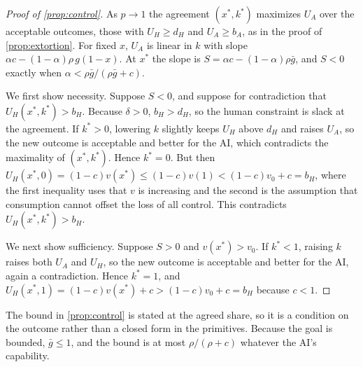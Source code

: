 \documentclass[article, 11pt, reqno]{amsart}
\theoremstyle{named}
\newcommand{\bH}{b_H}
\newcommand{\dH}{d_H}
\theoremstyle{plain}
\begin{document}
\begin{proof}[Proof of \cref{prop:control}]
As $p \to 1$ the agreement $(x^*, k^*)$ maximizes $U_A$ over the acceptable outcomes, those with $U_H \ge \dH$ and $U_A \ge b_A$, as in the proof of \cref{prop:extortion}. For fixed $x$, $U_A$ is linear in $k$ with slope $\alpha c - (1-\alpha)\rho\, g(1-x)$. At $x^*$ the slope is $S = \alpha c - (1-\alpha)\rho\bar g$, and $S < 0$ exactly when $\alpha < \rho\bar g/(\rho\bar g + c)$.

We first show necessity. Suppose $S < 0$, and suppose for contradiction that $U_H(x^*,k^*) > \bH$. Because $\delta > 0$, $\bH > \dH$, so the human constraint is slack at the agreement. If $k^* > 0$, lowering $k$ slightly keeps $U_H$ above $\dH$ and raises $U_A$, so the new outcome is acceptable and better for the AI, which contradicts the maximality of $(x^*,k^*)$. Hence $k^* = 0$. But then $U_H(x^*,0) = (1-c)v(x^*) \le (1-c)v(1) < (1-c)v_0 + c = \bH$, where the first inequality uses that $v$ is increasing and the second is the assumption that consumption cannot offset the loss of all control. This contradicts $U_H(x^*,k^*) > \bH$.

We next show sufficiency. Suppose $S > 0$ and $v(x^*) > v_0$. If $k^* < 1$, raising $k$ raises both $U_A$ and $U_H$, so the new outcome is acceptable and better for the AI, again a contradiction. Hence $k^* = 1$, and $U_H(x^*,1) = (1-c)v(x^*) + c > (1-c)v_0 + c = \bH$ because $c < 1$.
\end{proof}

The bound in \cref{prop:control} is stated at the agreed share, so it is a condition on the outcome rather than a closed form in the primitives. Because the goal is bounded, $\bar g \le 1$, and the bound is at most $\rho/(\rho + c)$ whatever the AI's capability.
\end{document}
